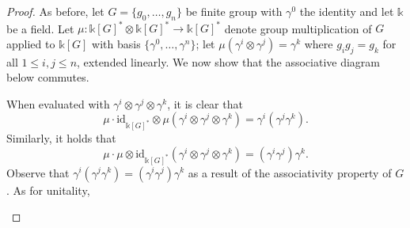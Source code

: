 \documentclass[ 12pt ]{article}
\begin{document}
\begin{enumerate}
		\begin{proof}
			As before, let $G = \{ g_0, \hdots, g_n \}$ be finite group with $\gamma^0$ the identity and let $\mathbb{k}$ be a field. Let $\mu : \mathbb{k}[G]^\ast \otimes \mathbb{k}[G]^\ast \to \mathbb{k}[G]^\ast$ denote group multiplication of $G$ applied to $\mathbb{k}[G]$ with basis $\{ \gamma^0, \hdots, \gamma^n \}$; let $\mu(\gamma^i \otimes \gamma^j) = \gamma^k$ where $g_i g_j = g_k$ for all $1 \leq i, j \leq n$, extended linearly. We now show that the associative diagram below commutes.
			\begin{center}
			\end{center}
			When evaluated with $\gamma^i \otimes \gamma^j \otimes \gamma^k$, it is clear that $$\mu \cdot \mathrm{id}_{\mathbb{k}[G]^\ast} \otimes \mu (\gamma^i \otimes \gamma^j \otimes \gamma^k) = \gamma^i (\gamma^j \gamma^k).$$ Similarly, it holds that $$\mu \cdot \mu \otimes \mathrm{id}_{\mathbb{k}[G]^\ast} (\gamma^i \otimes \gamma^j \otimes \gamma^k) = (\gamma^i \gamma^j) \gamma^k.$$ Observe that $\gamma^i (\gamma^j \gamma^k) = (\gamma^i \gamma^j) \gamma^k$ as a result of the associativity property of $G$. As for unitality,
			\begin{center}
\end{center}
\end{proof}
\end{enumerate}
\end{document}
